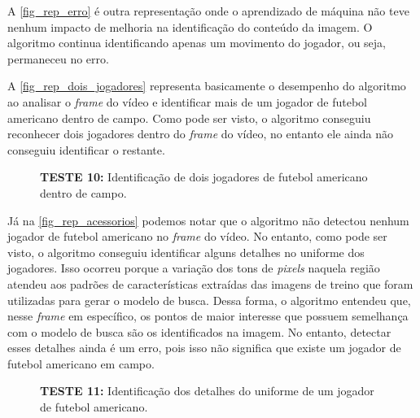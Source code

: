 A \autoref{fig_rep_erro} é outra representação onde o aprendizado de máquina não teve nenhum impacto de melhoria na identificação do conteúdo da imagem. O algoritmo continua identificando apenas um movimento do jogador, ou seja, permaneceu no erro.

A \autoref{fig_rep_dois_jogadores} representa basicamente o desempenho do algoritmo ao analisar o \textit{frame} do vídeo e identificar mais de um jogador de futebol americano dentro de campo. Como pode ser visto, o algoritmo conseguiu reconhecer dois jogadores dentro do \textit{frame} do vídeo, no entanto ele ainda não conseguiu identificar o restante.

\begin{figure}[ht]
	\caption{\label{fig_rep_dois_jogadores}\textbf{TESTE 10:} Identificação de dois jogadores de futebol americano dentro de campo.}
	\begin{center}
	\end{center}
	\centering {}
\end{figure}

Já na \autoref{fig_rep_acessorios} podemos notar que o algoritmo não detectou nenhum jogador de futebol americano no \textit{frame} do vídeo. No entanto, como pode ser visto, o algoritmo conseguiu identificar alguns detalhes no uniforme dos jogadores. Isso ocorreu porque a variação dos tons de \textit{pixels} naquela região atendeu aos padrões de características extraídas das imagens de treino que foram utilizadas para gerar o modelo de busca. Dessa forma, o algoritmo entendeu que, nesse \textit{frame} em específico, os pontos de maior interesse que possuem semelhança com o modelo de busca são os identificados na imagem. No entanto, detectar esses detalhes ainda é um erro, pois isso não significa que existe um jogador de futebol americano em campo.

\begin{figure}[ht]
	\caption{\label{fig_rep_acessorios}\textbf{TESTE 11:} Identificação dos detalhes do uniforme de um jogador de futebol americano.}
	\begin{center}
	\end{center}
	\centering {}
\end{figure}

